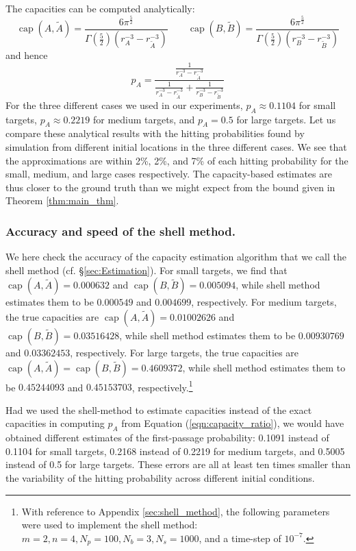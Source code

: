 \documentclass[12pt, nofootinbib,english, amsmath, amssymb, aps, priprint, graphicx,floatfix,draft]{revtex4-1}
\theoremstyle{plain}
\theoremstyle{definition}
\theoremstyle{plain}
\newcommand{\capac}[2]{\ensuremath{\operatorname{cap}}(#1,#2)}
\newcommand{\tA}{{\tilde A}}
\newcommand{\tB}{{\tilde B}}
\begin{document}
The capacities can be computed analytically:
\begin{equation}
\label{eqn:analytic_capacities}
\capac{A}{\tA}  =
\frac{6\pi^{\frac{5}{2}}}
{\Gamma(\frac{5}{2})(r_A^{-3} - r_\tA^{-3})}  \qquad
\capac{B}{\tB}  =
\frac{6\pi^{\frac{5}{2}}}
{\Gamma(\frac{5}{2})(r_B^{-3} - r_\tB^{-3})}
\end{equation}
and hence
\begin{equation*}
p_A = \frac{\frac{1}{r_A^{-3} - r_{\tilde{A}}^{-3}}}{\frac{1}{r_A^{-3} - r_{\tilde{A}}^{-3}} + \frac{1}{r_B^{-3} - r_{\tilde{B}}^{-3}}}
\end{equation*}
For the three different cases we used in our experiments, $p_A \approx 0.1104$ for small targets, $p_A \approx 0.2219$ for medium targets, and $p_A = 0.5$ for large targets.  Let us compare these analytical results with the hitting probabilities found by simulation from different initial locations in the three different cases.  We see that the approximations are within 2\%, 2\%, and 7\% of each hitting probability for the small, medium, and large cases respectively.  The capacity-based estimates are thus closer to the ground truth than we might expect from the bound given in Theorem \ref{thm:main_thm}.  

\subsubsection{Accuracy and speed of the shell method.}
\label{sec:toy_shell}
We here check the accuracy of the capacity estimation algorithm that we call the shell method (cf. \S\ref{sec:Estimation}). For small targets, we find that $\capac{A}{\tA}=0.000632$ and $\capac{B}{\tB}=0.005094$, while shell method estimates them to be $0.000549$ and $0.004699$, respectively. For medium targets, the true capacities are $\capac{A}{\tA}=0.01002626$ and $\capac{B}{\tB}=0.03516428$, while shell method estimates them to be $0.00930769$ and $0.03362453$, respectively. For large targets, the true capacities are $\capac{A}{\tA}=\capac{B}{\tB}=0.4609372$, while shell method estimates them to be $0.45244093 $ and $0.45153703$, respectively.\footnote{With reference to Appendix \ref{sec:shell_method}, the following parameters were used to implement the shell method: $m = 2, n = 4, N_p = 100, N_b = 3, N_s = 1000$, and a time-step of $10^{-7}$.}

Had we used the shell-method to estimate capacities instead of the exact capacities in computing $p_A$ from Equation
(\ref{eqn:capacity_ratio}), we would have obtained different estimates of the first-passage probability: 0.1091 instead of 0.1104 for small targets, 0.2168 instead of 0.2219 for medium targets, and 0.5005 instead of 0.5 for large targets.  These errors are all at least ten times smaller than the variability of the hitting probability across different initial conditions.
\end{document}
